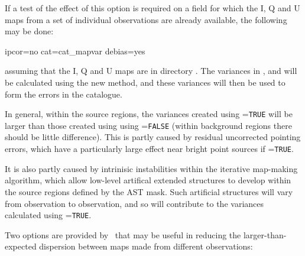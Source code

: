 If a test of the effect of this option is required on a field for which
the I, Q and U maps from a set of individual observations are already
available, the following may be done:

\begin{terminalv}
                   ipcor=no cat=cat_mapvar debias=yes
\end{terminalv}

assuming that the I, Q and U maps are in directory . The
variances in ,  and
 will be calculated using the new method, and
these variances will then be used to form the errors in the
 catalogue.

In general, within the source regions, the variances created using
=\texttt{TRUE} will be larger than those created using
using =\texttt{FALSE} (within background regions there
should be little difference).  This is partly caused by residual
uncorrected pointing errors, which have a particularly large effect near
bright point sources if =\texttt{TRUE}.

It is also partly caused by intrinisic instabilities within the iterative
map-making algorithm, which allow low-level artifical extended structures
to develop within the source regions defined by the AST mask. Such
artificial structures will vary from observation to observation, and so
will contribute to the variances calculated using =\texttt{TRUE}.

Two options are provided by \poltwomap\ that may be useful in reducing
the larger-than-expected dispersion between maps made from different
observations:

